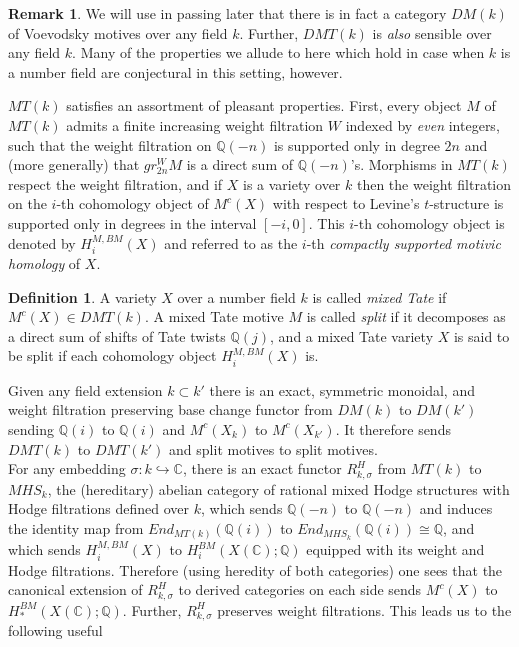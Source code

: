 \documentclass[11pt]{amsart}
\theoremstyle{definition}
\newtheorem{defn}[thm]{Definition}
\newtheorem{rem}[thm]{Remark}
\theoremstyle{remark}
\numberwithin{equation}{section}
\begin{document}
   \begin{rem}
   We will use in passing later that there is in fact a category $DM(k)$ of Voevodsky motives over any field $k$. Further, $DMT(k)$ is \textit{also} sensible over any field $k$. Many of the properties we allude to here which hold in case when $k$ is a number field are conjectural in this setting, however.
   \end{rem}

$MT(k)$ satisfies an assortment of pleasant properties. First, every object $M$ of $MT(k)$ admits a finite increasing weight filtration $W$ indexed by \textit{even} integers, such that the weight filtration on $\mathbb{Q}(-n)$ is supported only in degree $2n$ and (more generally) that $gr_{2n}^W M$ is a direct sum of $\mathbb{Q}(-n)$'s. Morphisms in $MT(k)$ respect the weight filtration, and if $X$ is a variety over $k$ then the weight filtration on the $i$-th cohomology object of $M^c(X)$ with respect to Levine's $t$-structure is supported only in degrees in the interval $[-i, 0]$. This $i$-th cohomology object is denoted by $H_i^{M,BM}(X)$ and referred to as the $i$-th \textit{compactly supported motivic homology} of $X$.

\begin{defn}\label{Mixed Tate}
    A variety $X$ over a number field $k$ is called \textit{mixed Tate} if $M^c(X) \in DMT(k)$. A mixed Tate motive $M$ is called \textit{split} if it decomposes as a direct sum of shifts of Tate twists $\mathbb{Q}(j)$, and a mixed Tate variety $X$ is said to be split if each cohomology object $H_i^{M, BM}(X)$ is.
\end{defn}

Given any field extension $k \subset k'$ there is an exact, symmetric monoidal, and weight filtration preserving base change functor from $DM(k)$ to $DM(k')$ sending $\mathbb{Q}(i)$ to $\mathbb{Q}(i)$ and $M^c(X_k)$ to  $M^c(X_{k'})$. It therefore sends $DMT(k)$ to $DMT(k')$ and split motives to split motives.\\

For any embedding $\sigma: k \hookrightarrow \mathbb{C}$, there is an exact functor $R^H_{k, \sigma}$ from $MT(k)$ to $MHS_k$, the (hereditary) abelian category of rational mixed Hodge structures with Hodge filtrations defined over $k$, which sends $\mathbb{Q}(-n)$ to $\mathbb{Q}(-n)$ and induces the identity map from $End_{MT(k)}(\mathbb{Q}(i))$ to $End_{MHS_k}(\mathbb{Q}(i)) \cong \mathbb{Q}$, and which sends $H_i^{M, BM}(X)$ to $H_i^{BM}(X(\mathbb{C}); \mathbb{Q})$ equipped with its weight and Hodge filtrations. Therefore (using heredity of both categories) one sees that the canonical extension of $R^H_{k, \sigma}$ to derived categories on each side sends $M^c(X)$ to $H_*^{BM}(X(\mathbb{C}); \mathbb{Q})$. Further, $R^H_{k,\sigma}$ preserves weight filtrations. This leads us to the following useful
\end{document}
